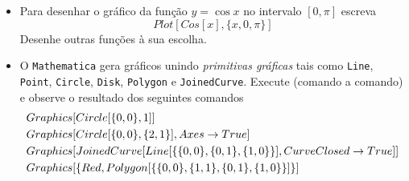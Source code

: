 \documentclass[11pt]{article}
\begin{document}
    \begin{itemize}
  
  \item[a)] Para desenhar o gr\'afico da fun\c{c}\~ao $y = \cos x $ no intervalo $[0, \pi]$ escreva 
\[
  Plot[Cos[x],\{x,0,\pi\}]
  \]
Desenhe outras fun\c{c}\~oes \`a sua escolha.
  
    \item[b)]   O \texttt{Mathematica} gera gr\'aficos unindo \textsl{primitivas gr\'aficas} tais como \texttt{Line}, \texttt{Point}, \texttt{Circle}, \texttt{Disk}, \texttt{Polygon} e \texttt{JoinedCurve}. Execute (comando a comando) e observe o resultado dos seguintes comandos
 \[\begin{array}{l}
 

Graphics[Circle[\{0, 0\}, 1]]


         \vspace{1mm}
\\

Graphics[Circle[\{0, 0\}, \{2, 1\}], Axes \rightarrow True]


         \vspace{1mm}
\\

Graphics[JoinedCurve[Line[\{\{0, 0\}, \{0, 1\}, \{1, 0\}\}], CurveClosed \rightarrow True]]

         \vspace{1mm}
\\



Graphics[\{Red, Polygon[\{\{0, 0\},  \{1, 1\}, \{0, 1\},\{1, 0\}\}]\}]

         \vspace{1mm}
\\

 
 
  




\end{array}\]
\end{itemize}
\end{document}
